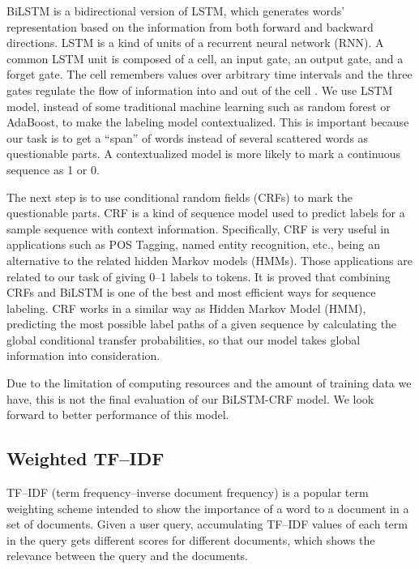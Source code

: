 BiLSTM is a bidirectional version of LSTM, which generates words' representation based on the information from both forward and backward directions. LSTM is a kind of units of a recurrent neural network (RNN). A common LSTM unit is composed of a cell, an input gate, an output gate, and a forget gate. The cell remembers values over arbitrary time intervals and the three gates regulate the flow of information into and out of the cell \cite{wiki:lstm}. We use LSTM model, instead of some traditional machine learning such as random forest or AdaBoost, to make the labeling model contextualized. This is important because our task is to get a ``span'' of words instead of several scattered words as questionable parts. A contextualized model is more likely to mark a continuous sequence as 1 or 0.

The next step is to use conditional random fields (CRFs) to mark the questionable parts. CRF is a kind of sequence model used to predict labels for a sample sequence with context information. Specifically, CRF is very useful in applications such as POS Tagging, named entity recognition, etc., being an alternative to the related hidden Markov models (HMMs). Those applications are related to our task of giving 0--1 labels to tokens. It is proved that combining CRFs and BiLSTM is one of the best and most efficient ways for sequence labeling. CRF works in a similar way as Hidden Markov Model (HMM), predicting the most possible label paths of a given sequence by calculating the global conditional transfer probabilities, so that our model takes global information into consideration.


Due to the limitation of computing resources and the amount of training data we have, this is not the final evaluation of our BiLSTM-CRF model. We look forward to better performance of this model.

\subsection{Weighted TF--IDF} \label{subsec:wtf}

TF--IDF (term frequency--inverse document frequency) is a popular term weighting scheme intended to show the importance of a word to a document in a set of documents. Given a user query, accumulating TF--IDF values of each term in the query gets different scores for different documents, which shows the relevance between the query and the documents.

